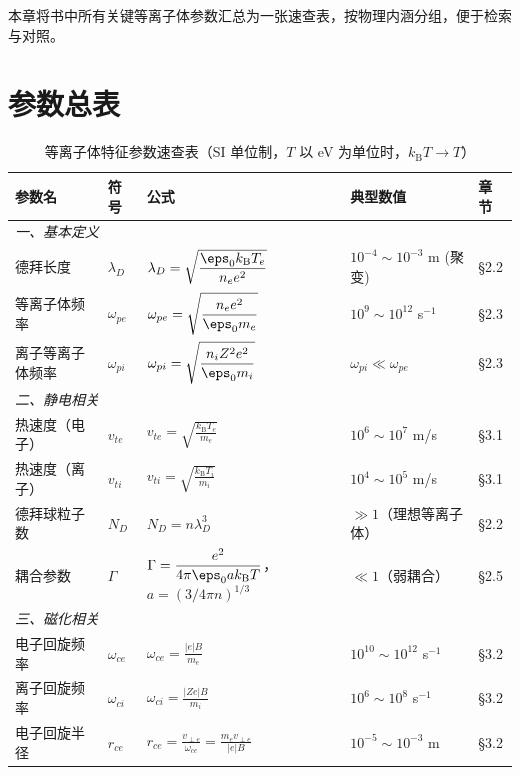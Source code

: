 本章将书中所有关键等离子体参数汇总为一张速查表，按物理内涵分组，便于检索与对照。


\section{参数总表}

\begin{table}[htbp]
\centering
\caption{等离子体特征参数速查表（SI 单位制，$T$ 以 eV 为单位时，$k_\mathrm{B}T\to T$）}
\label{tab:plasma-parameters}
\small
\begin{tabular}{@{}p{2.8cm}p{1.5cm}p{6.5cm}p{3.5cm}p{1.8cm}@{}}
\toprule
\textbf{参数名} & \textbf{符号} & \textbf{公式} & \textbf{典型数值} & \textbf{章节} \\
\midrule
\multicolumn{5}{l}{\textit{一、基本定义}} \\
\midrule
德拜长度 & $\lambda_D$ & $\displaystyle\lambda_D = \sqrt{\frac{\eps_0 k_\mathrm{B} T_e}{n_e e^2}}$ & $10^{-4}\sim10^{-3}$ m (聚变) & \S 2.2 \\
等离子体频率 & $\omega_{pe}$ & $\displaystyle\omega_{pe} = \sqrt{\frac{n_e e^2}{\eps_0 m_e}}$ & $10^{9}\sim10^{12}$ s$^{-1}$ & \S 2.3 \\
离子等离子体频率 & $\omega_{pi}$ & $\displaystyle\omega_{pi} = \sqrt{\frac{n_i Z^2 e^2}{\eps_0 m_i}}$ & $\omega_{pi}\ll\omega_{pe}$ & \S 2.3 \\
\midrule
\multicolumn{5}{l}{\textit{二、静电相关}} \\
\midrule
热速度（电子） & $v_{te}$ & $\displaystyle v_{te} = \sqrt{\frac{k_\mathrm{B}T_e}{m_e}}$ & $10^{6}\sim10^{7}$ m/s & \S 3.1 \\
热速度（离子） & $v_{ti}$ & $\displaystyle v_{ti} = \sqrt{\frac{k_\mathrm{B}T_i}{m_i}}$ & $10^{4}\sim10^{5}$ m/s & \S 3.1 \\
德拜球粒子数 & $N_D$ & $\displaystyle N_D = n\lambda_D^3$ & $\gg 1$（理想等离子体）& \S 2.2 \\
耦合参数 & $\Gamma$ & $\displaystyle\Gamma = \frac{e^2}{4\pi\eps_0 a k_\mathrm{B}T}$，$a=(3/4\pi n)^{1/3}$ & $\ll 1$（弱耦合）& \S 2.5 \\
\midrule
\multicolumn{5}{l}{\textit{三、磁化相关}} \\
\midrule
电子回旋频率 & $\omega_{ce}$ & $\displaystyle\omega_{ce} = \frac{|e|B}{m_e}$ & $10^{10}\sim10^{12}$ s$^{-1}$ & \S 3.2 \\
离子回旋频率 & $\omega_{ci}$ & $\displaystyle\omega_{ci} = \frac{|Ze|B}{m_i}$ & $10^{6}\sim10^{8}$ s$^{-1}$ & \S 3.2 \\
电子回旋半径 & $r_{ce}$ & $\displaystyle r_{ce} = \frac{v_{\perp e}}{\omega_{ce}} = \frac{m_e v_{\perp e}}{|e|B}$ & $10^{-5}\sim10^{-3}$ m & \S 3.2 \\

\end{tabular}
\end{table}
